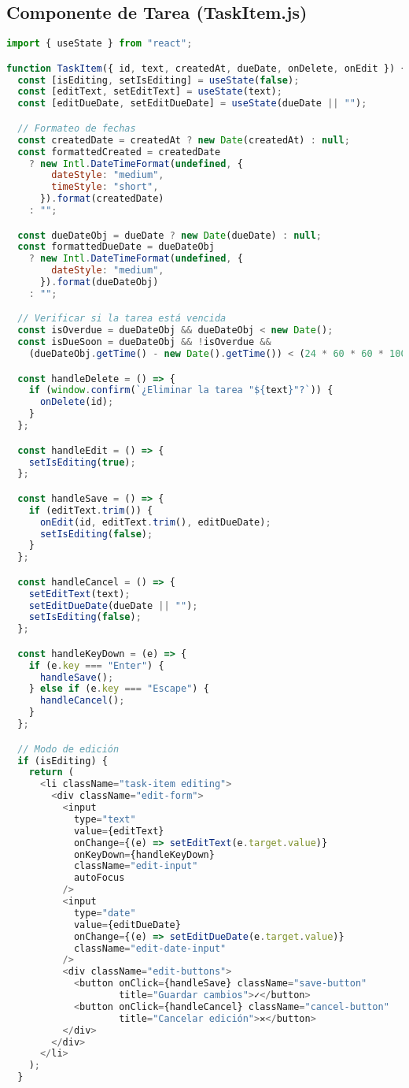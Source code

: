 \documentclass[12pt,a4paper]{article}
\begin{document}
\subsection{Componente de Tarea (TaskItem.js)}
\begin{lstlisting}[language=JavaScript,caption={Componente avanzado de tarea individual}]
import { useState } from "react";

function TaskItem({ id, text, createdAt, dueDate, onDelete, onEdit }) {
  const [isEditing, setIsEditing] = useState(false);
  const [editText, setEditText] = useState(text);
  const [editDueDate, setEditDueDate] = useState(dueDate || "");

  // Formateo de fechas
  const createdDate = createdAt ? new Date(createdAt) : null;
  const formattedCreated = createdDate
    ? new Intl.DateTimeFormat(undefined, {
        dateStyle: "medium",
        timeStyle: "short",
      }).format(createdDate)
    : "";

  const dueDateObj = dueDate ? new Date(dueDate) : null;
  const formattedDueDate = dueDateObj
    ? new Intl.DateTimeFormat(undefined, {
        dateStyle: "medium",
      }).format(dueDateObj)
    : "";

  // Verificar si la tarea está vencida
  const isOverdue = dueDateObj && dueDateObj < new Date();
  const isDueSoon = dueDateObj && !isOverdue && 
    (dueDateObj.getTime() - new Date().getTime()) < (24 * 60 * 60 * 1000);

  const handleDelete = () => {
    if (window.confirm(`¿Eliminar la tarea "${text}"?`)) {
      onDelete(id);
    }
  };

  const handleEdit = () => {
    setIsEditing(true);
  };

  const handleSave = () => {
    if (editText.trim()) {
      onEdit(id, editText.trim(), editDueDate);
      setIsEditing(false);
    }
  };

  const handleCancel = () => {
    setEditText(text);
    setEditDueDate(dueDate || "");
    setIsEditing(false);
  };

  const handleKeyDown = (e) => {
    if (e.key === "Enter") {
      handleSave();
    } else if (e.key === "Escape") {
      handleCancel();
    }
  };

  // Modo de edición
  if (isEditing) {
    return (
      <li className="task-item editing">
        <div className="edit-form">
          <input
            type="text"
            value={editText}
            onChange={(e) => setEditText(e.target.value)}
            onKeyDown={handleKeyDown}
            className="edit-input"
            autoFocus
          />
          <input
            type="date"
            value={editDueDate}
            onChange={(e) => setEditDueDate(e.target.value)}
            className="edit-date-input"
          />
          <div className="edit-buttons">
            <button onClick={handleSave} className="save-button"
                    title="Guardar cambios">✓</button>
            <button onClick={handleCancel} className="cancel-button"
                    title="Cancelar edición">✕</button>
          </div>
        </div>
      </li>
    );
  }


\end{lstlisting}
\end{document}
